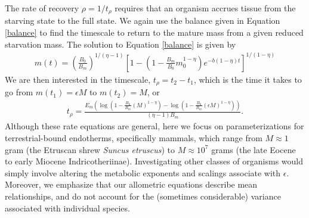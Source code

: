 \documentclass{pnastwo}
\begin{document}
\begin{article}

The rate of recovery $\rho = 1/t_\rho$ requires that an organism accrues tissue from the starving state to the full state.
We again use the balance given in Equation \ref{balance} to find the timescale to return to the mature mass from a given reduced starvation mass. The solution to Equation \ref{balance} is given by
\begin{eqnarray}
m\left(t\right)=\left(\frac{B_{0}}{B_{m}}\right)^{1/(\eta-1)}\left[1-\left(1-\frac{B_{m}}{B_{0}}m_{0}^{1-\eta}\right)e^{-b\left(1-\eta\right)t}\right]^{1/\left(1-\eta\right)}%
\end{eqnarray}
We are then interested in the timescale, $t_{\rho}=t_{2}-t_{1}$, which is the time it takes to go from $m\left(t_{1}\right)=\epsilon M$ to $m\left(t_{2}\right)=M$, or
\begin{eqnarray}
t_{\rho}=\frac{E_{m}\left(\log \left(1-\frac{B_{0}}{B_{m}}\left(M \right)^{1-\eta }\right)-\log \left(1-\frac{B_{0}}{B_{m}}\left(\epsilon M \right)^{1-\eta }\right)\right)}{(\eta -1) B_{m}}.
\end{eqnarray}
Although these rate equations are general, here we focus on parameterizations for terrestrial-bound endotherms, specifically mammals, which range from $M\approx1$ gram (the Etruscan shrew \emph{Suncus etruscus}) to $M\approx10^7$ grams (the late Eocene to early Miocene Indricotheriinae).
Investigating other classes of organisms would simply involve altering the metabolic exponents and scalings associate with $\epsilon$. Moreover, we emphasize that our allometric equations describe mean relationships, and do not account for the (sometimes considerable) variance associated with individual species. 





\end{article}
\end{document}
